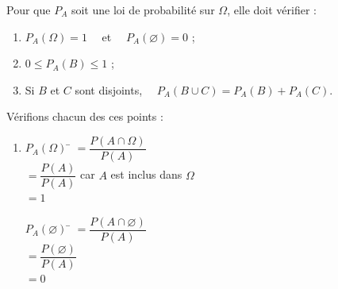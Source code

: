\documentclass[a4paper,11pt,cours]{nsi} %
\begin{document}
\begin{demonstration}
	Pour que $P_A$ soit une loi de probabilité sur $\Omega$, elle doit vérifier :
	\begin{enumerate}[label=\textbullet]
		\item 	$P_A(\Omega)=1 \quad$ et $\quad P_A(\varnothing)=0$ ; 
		\item 	$0\leqslant P_A(B) \leqslant 1$ ;
		\item	Si $B$ et $C$ sont disjoints, $\quad P_A(B\cup C)=P_A(B)+P_A(C)$.
	\end{enumerate}
	Vérifions chacun des ces points :
	\begin{enumerate}
		\item	
		
		
		\begin{multicols}{2}
			\begin{tabbing}
				$P_A(\Omega)$ \=	$=\dfrac{P(A\cap \Omega)}{P(A)}$ \=\\[0.5em]
				\>	$=\dfrac{P(A)}{P(A)}$	\>car $A$ est inclus dans $\Omega$\\[0.5em]
				\>	$=1$
			\end{tabbing}
		
			\begin{tabbing}
				$P_A(\varnothing)$ \=	$=\dfrac{P(A\cap \varnothing)}{P(A)}$ \\[0.5em]
				\>	$=\dfrac{P(\varnothing)}{P(A)}$	\\[0.5em]
				\>	$=0$
			\end{tabbing}
		\end{multicols} 
		

\end{enumerate}
\end{demonstration}
\end{document}
